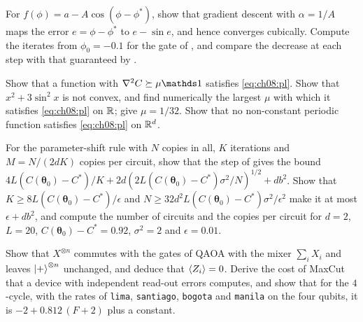 \documentclass[handoutsbeamer.tex]{subfiles}
\begin{document}
\begin{frame}
\onp{\footnotesize}
\begin{exe}\label{exe:ch08:gate1}
For $f(\phi) = a-A\cos(\phi-\phi^*)$, show that gradient descent with $\alpha = 1/A$ maps the error $e = \phi-\phi^*$ to $e-\sin e$, and hence converges cubically. Compute the iterates from $\phi_0 = -0.1$ for the gate of , and compare the decrease at each step with that guaranteed by .
\end{exe}
\begin{exe}\label{exe:ch08:pl}
Show that a function with $\nabla^2C\succeq\mu\one$ satisfies \eqref{eq:ch08:pl}. Show that $x^2+3\sin^2x$ is not convex, and find numerically the largest $\mu$ with which it satisfies \eqref{eq:ch08:pl} on $\mathbb{R}$; \citet{karimi2016linear} give $\mu = 1/32$. Show that no non-constant periodic function satisfies \eqref{eq:ch08:pl} on $\mathbb{R}^d$.
\end{exe}
\end{frame}

\begin{frame}
\onp{\footnotesize}
\begin{exe}\label{exe:ch08:budget}
For the parameter-shift rule with $N$ copies in all, $K$ iterations and $M = N/(2dK)$ copies per circuit, show that the step of  gives the bound $4L(C(\boldsymbol\theta_0)-C^*)/K+2d(2L(C(\boldsymbol\theta_0)-C^*)\sigma^2/N)^{1/2}+db^2$. Show that $K\ge8L(C(\boldsymbol\theta_0)-C^*)/\epsilon$ and $N\ge32d^2L(C(\boldsymbol\theta_0)-C^*)\sigma^2/\epsilon^2$ make it at most $\epsilon+db^2$, and compute the number of circuits and the copies per circuit for $d = 2$, $L = 20$, $C(\boldsymbol\theta_0)-C^* = 0.92$, $\sigma^2 = 2$ and $\epsilon = 0.01$.
\end{exe}
\begin{exe}\label{exe:ch08:readout}
Show that $X^{\otimes n}$ commutes with the gates of QAOA with the mixer $\sum_iX_i$ and leaves $\ket+^{\otimes n}$ unchanged, and deduce that $\braket{Z_i} = 0$. Derive the cost of MaxCut that a device with independent read-out errors computes, and show that for the $4$-cycle, with the rates of \texttt{lima}, \texttt{santiago}, \texttt{bogota} and \texttt{manila} on the four qubits, it is $-2+0.812\,(F+2)$ plus a constant.
\end{exe}
\end{frame}
\end{document}
